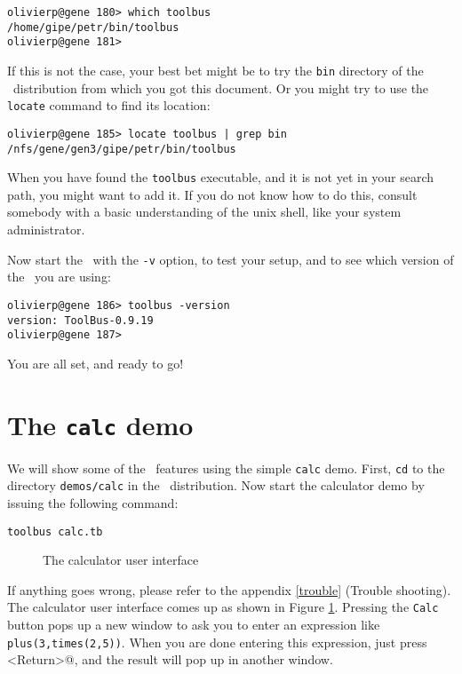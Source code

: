 \begin{verbatim}
olivierp@gene 180> which toolbus
/home/gipe/petr/bin/toolbus
olivierp@gene 181>
\end{verbatim}

If this is not the case, your best bet might be to try the {\tt bin}
directory of the \TB\ distribution from which you got this document.
Or you might try to use the {\tt locate} command
to find its location:
\begin{verbatim}
olivierp@gene 185> locate toolbus | grep bin
/nfs/gene/gen3/gipe/petr/bin/toolbus
\end{verbatim}

When you have found the {\tt toolbus} executable, and it is not yet
in your search path, you might want to add it. If you do not know how
to do this, consult somebody with a basic understanding of the
unix shell, like your system administrator.

Now start the \TB\ with the {\tt -v} option, to test your setup,
and to see which version of the \TB\ you are using:

\begin{verbatim}
olivierp@gene 186> toolbus -version
version: ToolBus-0.9.19
olivierp@gene 187>
\end{verbatim}

You are all set, and ready to go!

\section{The {\tt calc} demo}

We will show some of the \TB\ features using the simple {\tt calc} demo.
First, {\tt cd} to the directory {\tt demos/calc} in the \TB\ distribution.
Now start the calculator demo by issuing the following command:

\begin{verbatim}
toolbus calc.tb
\end{verbatim}

\begin{figure}[htb]
\centerline{}
\caption{The calculator user interface}
\label{calc-ui}
\end{figure}

If anything goes wrong, please refer to the appendix 
\ref{trouble} (Trouble shooting).
The calculator user interface comes up as shown in Figure \ref{calc-ui}.
Pressing the {\tt Calc} button pops up a new window to ask you to enter
an expression like {\tt plus(3,times(2,5))}.
When you are done entering this expression, just press 
\verb@<Return>@, and the result will pop up in another window.

